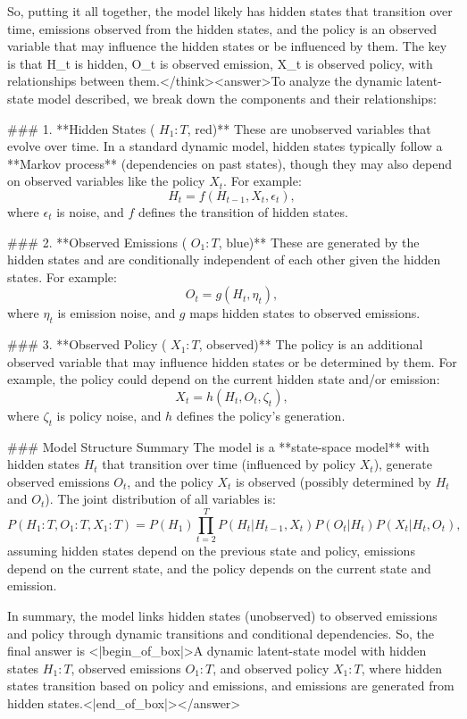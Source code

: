 So, putting it all together, the model likely has hidden states that transition over time, emissions observed from the hidden states, and the policy is an observed variable that may influence the hidden states or be influenced by them. The key is that H_t is hidden, O_t is observed emission, X_t is observed policy, with relationships between them.</think><answer>To analyze the dynamic latent-state model described, we break down the components and their relationships:  

### 1. **Hidden States ( \( H_1:T \), red)**  
These are unobserved variables that evolve over time. In a standard dynamic model, hidden states typically follow a **Markov process** (dependencies on past states), though they may also depend on observed variables like the policy \( X_t \). For example:  
\[ H_t = f(H_{t-1}, X_t, \epsilon_t), \]  
where \( \epsilon_t \) is noise, and \( f \) defines the transition of hidden states.    

### 2. **Observed Emissions ( \( O_1:T \), blue)**  
These are generated by the hidden states and are conditionally independent of each other given the hidden states. For example:  
\[ O_t = g(H_t, \eta_t), \]  
where \( \eta_t \) is emission noise, and \( g \) maps hidden states to observed emissions.    

### 3. **Observed Policy ( \( X_1:T \), observed)**  
The policy is an additional observed variable that may influence hidden states or be determined by them. For example, the policy could depend on the current hidden state and/or emission:  
\[ X_t = h(H_t, O_t, \zeta_t), \]  
where \( \zeta_t \) is policy noise, and \( h \) defines the policy’s generation.    

### Model Structure Summary  
The model is a **state-space model** with hidden states \( H_t \) that transition over time (influenced by policy \( X_t \)), generate observed emissions \( O_t \), and the policy \( X_t \) is observed (possibly determined by \( H_t \) and \( O_t \)). The joint distribution of all variables is:  
\[ P(H_1:T, O_1:T, X_1:T) = P(H_1) \prod_{t=2}^T P(H_t | H_{t-1}, X_t) P(O_t | H_t) P(X_t | H_t, O_t), \]  
assuming hidden states depend on the previous state and policy, emissions depend on the current state, and the policy depends on the current state and emission.  

In summary, the model links hidden states (unobserved) to observed emissions and policy through dynamic transitions and conditional dependencies.  
So, the final answer is <|begin_of_box|>A dynamic latent-state model with hidden states \( H_1:T \), observed emissions \( O_1:T \), and observed policy \( X_1:T \), where hidden states transition based on policy and emissions, and emissions are generated from hidden states.<|end_of_box|></answer>